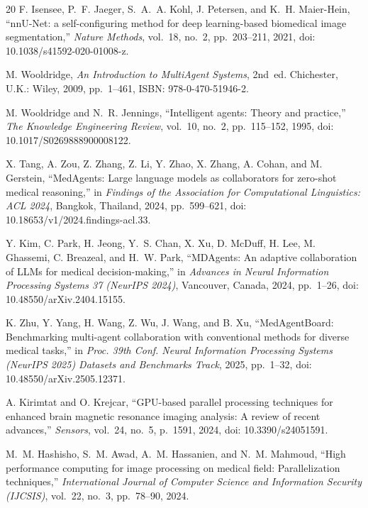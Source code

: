 \documentclass[conference]{IEEEtran}
\begin{document}
\begin{thebibliography}{20}
 F. Isensee, P.~F. Jaeger, S.~A.~A. Kohl, J. Petersen, and K.~H. Maier-Hein, ``nnU-Net: a self-configuring method for deep learning-based biomedical image segmentation,'' \textit{Nature Methods}, vol.~18, no.~2, pp.~203--211, 2021, doi: 10.1038/s41592-020-01008-z.

 M. Wooldridge, \textit{An Introduction to MultiAgent Systems}, 2nd~ed. Chichester, U.K.: Wiley, 2009, pp.~1--461, ISBN: 978-0-470-51946-2.

 M. Wooldridge and N.~R. Jennings, ``Intelligent agents: Theory and practice,'' \textit{The Knowledge Engineering Review}, vol.~10, no.~2, pp.~115--152, 1995, doi: 10.1017/S0269888900008122.

 X. Tang, A. Zou, Z. Zhang, Z. Li, Y. Zhao, X. Zhang, A. Cohan, and M. Gerstein, ``MedAgents: Large language models as collaborators for zero-shot medical reasoning,'' in \textit{Findings of the Association for Computational Linguistics: ACL 2024}, Bangkok, Thailand, 2024, pp.~599--621, doi: 10.18653/v1/2024.findings-acl.33.

 Y. Kim, C. Park, H. Jeong, Y.~S. Chan, X. Xu, D. McDuff, H. Lee, M. Ghassemi, C. Breazeal, and H.~W. Park, ``MDAgents: An adaptive collaboration of LLMs for medical decision-making,'' in \textit{Advances in Neural Information Processing Systems 37 (NeurIPS 2024)}, Vancouver, Canada, 2024, pp.~1--26, doi: 10.48550/arXiv.2404.15155.

 K. Zhu, Y. Yang, H. Wang, Z. Wu, J. Wang, and B. Xu, ``MedAgentBoard: Benchmarking multi-agent collaboration with conventional methods for diverse medical tasks,'' in \textit{Proc. 39th Conf. Neural Information Processing Systems (NeurIPS 2025) Datasets and Benchmarks Track}, 2025, pp.~1--32, doi: 10.48550/arXiv.2505.12371.

 A. Kirimtat and O. Krejcar, ``GPU-based parallel processing techniques for enhanced brain magnetic resonance imaging analysis: A review of recent advances,'' \textit{Sensors}, vol.~24, no.~5, p.~1591, 2024, doi: 10.3390/s24051591.

 M.~M. Hashisho, S.~M. Awad, A.~M. Hassanien, and N.~M. Mahmoud, ``High performance computing for image processing on medical field: Parallelization techniques,'' \textit{International Journal of Computer Science and Information Security (IJCSIS)}, vol.~22, no.~3, pp.~78--90, 2024.


\end{thebibliography}
\end{document}
